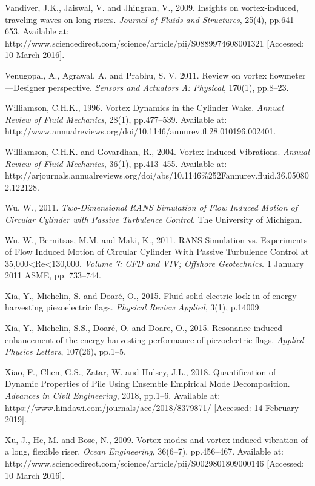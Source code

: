 \documentclass[]{article}
\begin{document}
Vandiver, J.K., Jaiswal, V. and Jhingran, V., 2009. Insights on
vortex-induced, traveling waves on long risers. \emph{Journal of Fluids
and Structures}, 25(4), pp.641--653. Available at:
http://www.sciencedirect.com/science/article/pii/S0889974608001321
{[}Accessed: 10 March 2016{]}.

Venugopal, A., Agrawal, A. and Prabhu, S. V, 2011. Review on vortex
flowmeter---Designer perspective. \emph{Sensors and Actuators A:
Physical}, 170(1), pp.8--23.

Williamson, C.H.K., 1996. Vortex Dynamics in the Cylinder Wake.
\emph{Annual Review of Fluid Mechanics}, 28(1), pp.477--539. Available
at:
http://www.annualreviews.org/doi/10.1146/annurev.fl.28.010196.002401.

Williamson, C.H.K. and Govardhan, R., 2004. Vortex-Induced Vibrations.
\emph{Annual Review of Fluid Mechanics}, 36(1), pp.413--455. Available
at:
http://arjournals.annualreviews.org/doi/abs/10.1146\%252Fannurev.fluid.36.050802.122128.

Wu, W., 2011. \emph{Two-Dimensional RANS Simulation of Flow Induced
Motion of Circular Cylinder with Passive Turbulence Control}. The
University of Michigan.

Wu, W., Bernitsas, M.M. and Maki, K., 2011. RANS Simulation vs.
Experiments of Flow Induced Motion of Circular Cylinder With Passive
Turbulence Control at 35,000\textless{}Re\textless{}130,000.
\emph{Volume 7: CFD and VIV; Offshore Geotechnics}. 1 January 2011 ASME,
pp. 733--744.

Xia, Y., Michelin, S. and Doaré, O., 2015. Fluid-solid-electric lock-in
of energy-harvesting piezoelectric flags. \emph{Physical Review
Applied}, 3(1), p.14009.

Xia, Y., Michelin, S.S., Doaré, O. and Doare, O., 2015.
Resonance-induced enhancement of the energy harvesting performance of
piezoelectric flags. \emph{Applied Physics Letters}, 107(26), pp.1--5.

Xiao, F., Chen, G.S., Zatar, W. and Hulsey, J.L., 2018. Quantification
of Dynamic Properties of Pile Using Ensemble Empirical Mode
Decomposition. \emph{Advances in Civil Engineering}, 2018, pp.1--6.
Available at: https://www.hindawi.com/journals/ace/2018/8379871/
{[}Accessed: 14 February 2019{]}.

Xu, J., He, M. and Bose, N., 2009. Vortex modes and vortex-induced
vibration of a long, flexible riser. \emph{Ocean Engineering}, 36(6--7),
pp.456--467. Available at:
http://www.sciencedirect.com/science/article/pii/S0029801809000146
{[}Accessed: 10 March 2016{]}.
\end{document}
